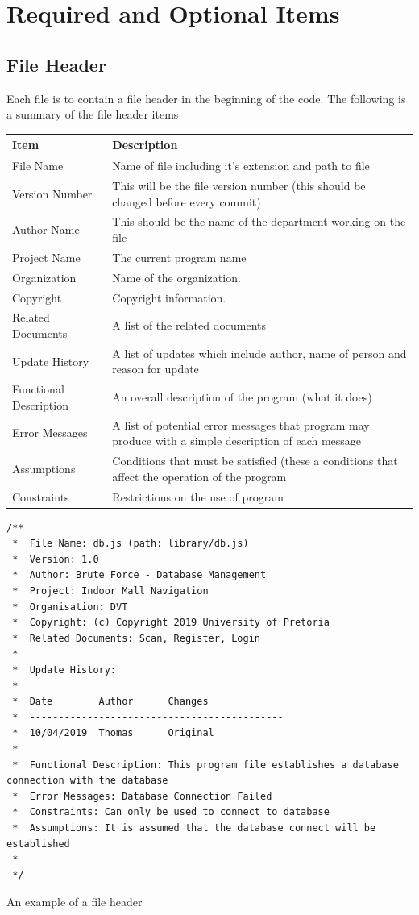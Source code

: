 \documentclass{article}
\begin{document}
\section{Required and Optional Items}
\subsection{File Header}
Each file is to contain a file header in the beginning of the code. The following is a summary of the file header items
\cite{kung}
\begin{center}
        \begin{tabular}{|>{\centering}p{3.5cm}|p{10cm}|}
             \hline
              \textbf{Item} & \textbf{Description}  \tabularnewline
             \hline
             File Name & Name of file including it's extension and path to file\tabularnewline
             \hline
              Version Number & This will be the file version number (this should be changed before every commit)\tabularnewline
              \hline
             Author Name & This should be the name of the department working on the file\tabularnewline 
             \hline
             Project Name & The current program name\tabularnewline
             \hline
             Organization & Name of the organization.\tabularnewline
             \hline
             Copyright & Copyright information.\tabularnewline
             \hline
             Related Documents & A list of the related documents\tabularnewline
             \hline
             Update History & A list of updates which include author, name of person and reason for update\tabularnewline
             \hline
             Functional Description & An overall description of the program (what it does)\tabularnewline
             \hline
             Error Messages & A list of potential error messages that program may produce with a simple description of each message\tabularnewline
             \hline
             Assumptions & Conditions that must be satisfied (these a conditions that affect the operation of the program\tabularnewline
             \hline
             Constraints & Restrictions on the use of program\tabularnewline
             \hline
        \end{tabular}
    \end{center}
\pagebreak


    
\begin{lstlisting}
/**
 *  File Name: db.js (path: library/db.js)
 *  Version: 1.0
 * 	Author: Brute Force - Database Management
 * 	Project: Indoor Mall Navigation
 * 	Organisation: DVT
 *  Copyright: (c) Copyright 2019 University of Pretoria
 *  Related Documents: Scan, Register, Login
 * 	
 * 	Update History:
 * 
 *  Date		Author		Changes
 * 	--------------------------------------------
 * 	10/04/2019 	Thomas		Original
 * 
 * 	Functional Description: This program file establishes a database connection with the database
 * 	Error Messages: Database Connection Failed
 * 	Constraints: Can only be used to connect to database
 * 	Assumptions: It is assumed that the database connect will be established
 * 
 */
\end{lstlisting}
An example of a file header
\end{document}

